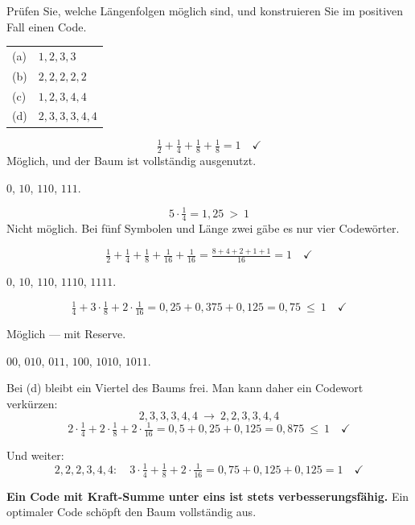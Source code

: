 \begin{aufgabe}
Prüfen Sie, welche Längenfolgen möglich sind, und konstruieren Sie im positiven Fall einen Code.
\begin{center}
{\small
\renewcommand{\arraystretch}{1.4}
\begin{tabular}{@{}P{0.8cm}P{7.6cm}@{}}
\toprule
(a) & $1,2,3,3$\\
(b) & $2,2,2,2,2$\\
(c) & $1,2,3,4,4$\\
(d) & $2,3,3,3,4,4$\\
\bottomrule
\end{tabular}}
\end{center}

\loesung
{}
\[ \tfrac12+\tfrac14+\tfrac18+\tfrac18 = 1 \quad \checkmark \]
Möglich, und der Baum ist vollständig ausgenutzt.

 $0$, $10$, $110$, $111$.

\[ 5\cdot\tfrac14 = 1{,}25 \ >\ 1 \]
\textcolor{akzent}{Nicht möglich.} Bei fünf Symbolen und Länge zwei gäbe es nur vier Codewörter.

\[ \tfrac12+\tfrac14+\tfrac18+\tfrac1{16}+\tfrac1{16} = \tfrac{8+4+2+1+1}{16} = 1 \quad \checkmark \]

 $0$, $10$, $110$, $1110$, $1111$.

\[ \tfrac14 + 3\cdot\tfrac18 + 2\cdot\tfrac1{16} = 0{,}25+0{,}375+0{,}125 = 0{,}75 \ \le\ 1 \quad \checkmark \]

Möglich --- mit Reserve.

 $00$, $010$, $011$, $100$, $1010$, $1011$.

Bei (d) bleibt ein Viertel des Baums frei. Man kann daher ein Codewort verkürzen:
\[ 2,3,3,3,4,4 \ \longrightarrow\ 2,2,3,3,4,4 \]
\[ 2\cdot\tfrac14 + 2\cdot\tfrac18 + 2\cdot\tfrac1{16} = 0{,}5+0{,}25+0{,}125 = 0{,}875 \ \le\ 1 \quad \checkmark \]

Und weiter:
\[ 2,2,2,3,4,4: \quad 3\cdot\tfrac14+\tfrac18+2\cdot\tfrac1{16} = 0{,}75+0{,}125+0{,}125 = 1 \quad \checkmark \]

\begin{center}
\begin{minipage}{0.9\textwidth}
\textbf{Ein Code mit Kraft-Summe unter eins ist stets verbesserungsfähig.} Ein optimaler Code schöpft den Baum vollständig aus.
\end{minipage}
\end{center}


\end{aufgabe}
